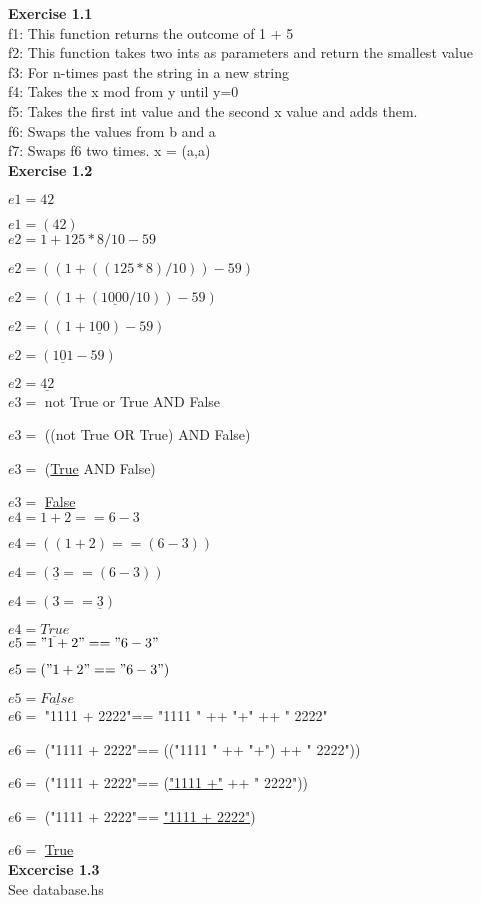\documentclass[12pt,a4paper]{report}
\begin{document}
\textbf{Exercise 1.1}\\

f1: This function returns the outcome of 1 + 5 \\

f2: This function takes two ints as parameters and return the smallest value \\

f3: For n-times past the string in a new string \\

f4: Takes the x mod from y until y=0 \\

f5: Takes the first int value and the second x value and adds them. \\

f6: Swaps the values from b and a \\

f7: Swaps f6 two times. x = (a,a) \\


\textbf{Exercise 1.2}

$ e1 = 42$

$e1 = (42)$ \\


$e2 = 1 + 125 * 8 / 10 - 59$ 

$e2 = ((1 + ((125 * 8) / 10)) - 59)$ 

$ e2 = ((1 + (\underline{1000} / 10)) - 59) $

$ e2 = ((1 + \underline{100}) - 59) $

$ e2 = (\underline{101} - 59) $

$ e2 = \underline{42}$ \\


$ e3 =$ not True or True AND False  

$ e3 =$ ((not True OR True) AND False)  

$ e3 =$ (\underline{True} AND False)  

$ e3 =$ \underline{False} \\


$e4 = 1 + 2 == 6 - 3$

$e4 = ((1 + 2) == (6 - 3))$

$e4 = (\underline{3} == (6 - 3))$

$e4 = (3 == \underline{3})$

$e4 = \underline{True}$ \\


$e5 = "1 + 2"== "6 - 3" $

$e5 = ("1 + 2"== "6 - 3") $

$e5 = \underline{False}$ \\


$e6=$ "1111 + 2222"== "1111 " ++ "+" ++ " 2222" 

$e6=$ ("1111 + 2222"== (("1111 " ++ "+") ++ " 2222")) 

$e6=$ ("1111 + 2222"== (\underline{"1111 +"} ++ " 2222"))

$e6=$ ("1111 + 2222"== \underline{"1111 + 2222"})

$e6=$ \underline{True} \\

\textbf{Excercise 1.3} \\
See database.hs
\end{document}
